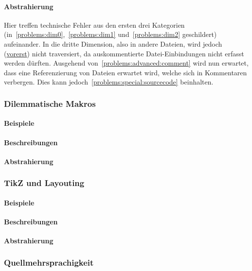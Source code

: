 {\paragraph*{Abstrahierung}
Hier treffen technische Fehler aus den ersten drei Kategorien (in~\ref{problems:dim0},~\ref{problems:dim1} und~\ref{problems:dim2} geschildert) aufeinander. In die dritte Dimension, also in andere Dateien, wird jedoch (\hyperref[problems:special:comments]{vorerst}) nicht traversiert, da auskommentierte Datei-Einbindungen nicht erfasst werden dürften. 
Ausgehend von~\ref{problems:advanced:comment} wird nun erwartet, dass eine Referenzierung von Dateien erwartet wird, welche sich in Kommentaren verbergen. Dies kann jedoch~\ref{problems:special:sourcecode} beinhalten.


\subsubsection{Dilemmatische Makros}\label{problems:special:macrodilemma}%
\paragraph*{Beispiele}
\paragraph*{Beschreibungen}
\paragraph*{Abstrahierung}

\subsubsection{TikZ und Layouting}\label{problems:advanced:layouting}
\paragraph*{Beispiele}
\paragraph*{Beschreibungen}
\paragraph*{Abstrahierung}

\subsubsection{Quellmehrsprachigkeit}\label{problems:special:sourcecode}
}
